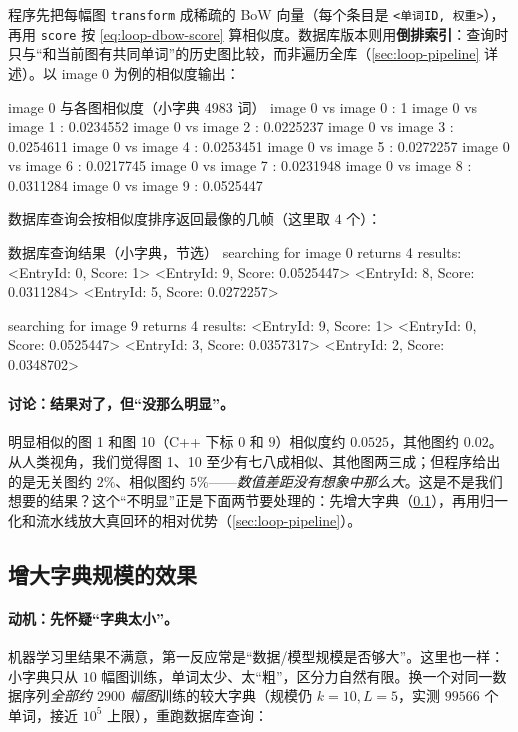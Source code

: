 \noindent 程序先把每幅图 \verb|transform| 成稀疏的 BoW 向量（每个条目是 \verb|<单词ID, 权重>|），再用 \verb|score| 按 \cref{eq:loop-dbow-score} 算相似度。数据库版本则用\textbf{倒排索引}：查询时只与“和当前图有共同单词”的历史图比较，而非遍历全库（\cref{sec:loop-pipeline} 详述）。以 image 0 为例的相似度输出：

\begin{codebox}[text]{image 0 与各图相似度（小字典 4983 词）}
image 0 vs image 0 : 1
image 0 vs image 1 : 0.0234552
image 0 vs image 2 : 0.0225237
image 0 vs image 3 : 0.0254611
image 0 vs image 4 : 0.0253451
image 0 vs image 5 : 0.0272257
image 0 vs image 6 : 0.0217745
image 0 vs image 7 : 0.0231948
image 0 vs image 8 : 0.0311284
image 0 vs image 9 : 0.0525447
\end{codebox}

\noindent 数据库查询会按相似度排序返回最像的几帧（这里取 $4$ 个）：

\begin{codebox}[text]{数据库查询结果（小字典，节选）}
searching for image 0 returns 4 results:
<EntryId: 0, Score: 1>
<EntryId: 9, Score: 0.0525447>
<EntryId: 8, Score: 0.0311284>
<EntryId: 5, Score: 0.0272257>

searching for image 9 returns 4 results:
<EntryId: 9, Score: 1>
<EntryId: 0, Score: 0.0525447>
<EntryId: 3, Score: 0.0357317>
<EntryId: 2, Score: 0.0348702>
\end{codebox}

\paragraph{讨论：结果对了，但“没那么明显”。}
明显相似的图 1 和图 10（C++ 下标 $0$ 和 $9$）相似度约 $0.0525$，其他图约 $0.02$\cite{gaoxiang2019slam14}。从人类视角，我们觉得图 1、10 至少有七八成相似、其他图两三成；但程序给出的是无关图约 $2\%$、相似图约 $5\%$——\emph{数值差距没有想象中那么大}。这是不是我们想要的结果？这个“不明显”正是下面两节要处理的：先增大字典（\cref{sec:loop-score-bigdict}），再用归一化和流水线放大真回环的相对优势（\cref{sec:loop-pipeline}）。

\subsection{增大字典规模的效果}
\label{sec:loop-score-bigdict}

\paragraph{动机：先怀疑“字典太小”。}
机器学习里结果不满意，第一反应常是“数据/模型规模是否够大”\cite{gaoxiang2019slam14}。这里也一样：小字典只从 $10$ 幅图训练，单词太少、太“粗”，区分力自然有限。换一个对同一数据序列\emph{全部约 $2900$ 幅图}训练的较大字典（规模仍 $k=10,L=5$，实测 $99566$ 个单词，接近 $10^5$ 上限），重跑数据库查询：

